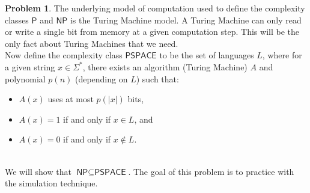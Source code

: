 \documentclass[11pt]{article}
\theoremstyle{definition}
\theoremstyle{definition}
\newtheorem{required}{Problem}
\theoremstyle{definition}
\begin{document}
\begin{required} \label{S30Prob3}
The underlying model of computation used to define the complexity classes $\textsf{P}$ and $\textsf{NP}$ is the Turing Machine model. A Turing Machine can only read or write a single bit from memory at a given computation step. This will be the only fact about Turing Machines that we need. \\

\noindent Now define the complexity class $\textsf{PSPACE}$ to be the set of languages $L$, where for a given string $x \in \Sigma^{*}$, there exists an algorithm (Turing Machine) $A$ and polynomial $p(n)$ (depending on $L$) such that:
\begin{itemize}
\item $A(x)$ uses at most $p(|x|)$ bits,
\item $A(x) = 1$ if and only if $x \in L$, and
\item $A(x) = 0$ if and only if $x \not \in L$.
\end{itemize}

\noindent \\ We will show that $\textsf{NP} \subseteq \textsf{PSPACE}$. The goal of this problem is to practice with the simulation technique.
\end{required}
\end{document}
